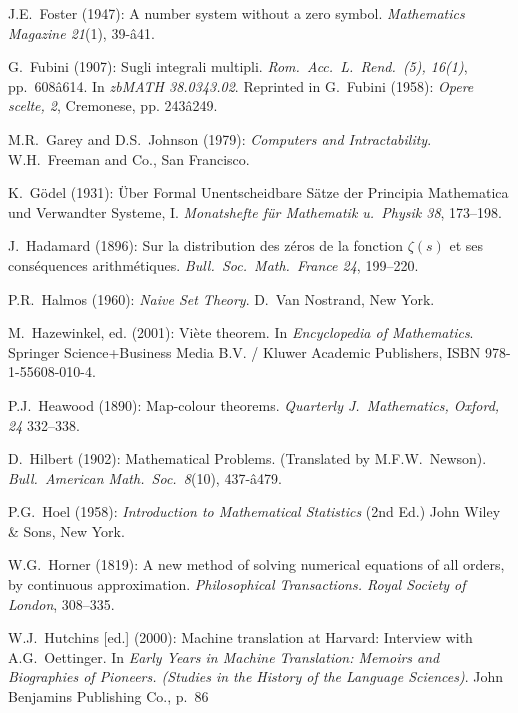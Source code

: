 \begin{thebibliography}{999}
J.E.~Foster (1947): A number system without a zero symbol.
{\it Mathematics Magazine 21}(1), 39-â41.

G.~Fubini (1907): Sugli integrali multipli.
{\it Rom.~Acc.~L.~Rend.~(5), 16(1)}, pp.~608â614.  In {\it zbMATH
  38.0343.02}.  Reprinted in
G.~Fubini (1958): {\it Opere scelte, 2}, Cremonese, pp. 243â249.



M.R.~Garey and D.S.~Johnson (1979):
{\it Computers and Intractability}.
W.H.~Freeman and Co., San Francisco.

K.~G\"{o}del (1931): \"{U}ber Formal Unentscheidbare S\"{a}tze der
Principia Mathematica und Verwandter Systeme, I.  {\it Monatshefte
f\"{u}r Mathematik u.~Physik 38}, 173--198.



J.~Hadamard (1896):
Sur la distribution des z\'{e}ros de la fonction $\zeta(s)$ et ses
cons\'{e}quences arithm\'{e}tiques.
{\it Bull.~Soc.~Math.~France 24}, 199--220.

P.R.~Halmos (1960):
{\it Naive Set Theory}.
D.~Van Nostrand, New York.

M.~Hazewinkel, ed. (2001): %
Vi\`{e}te theorem.  In {\it Encyclopedia of Mathematics}.
Springer Science+Business Media B.V. / Kluwer Academic Publishers,
ISBN 978-1-55608-010-4.

P.J.~Heawood (1890):
Map-colour theorems.  {\it Quarterly J.~Mathematics, Oxford, 24}
332--338.

D.~Hilbert (1902): Mathematical Problems.  (Translated by
M.F.W.~Newson).  {\it Bull.~American Math.~Soc.~8}(10), 437-â479.

P.G.~Hoel (1958):
{\it Introduction to Mathematical Statistics} (2nd Ed.)
John Wiley \& Sons, New York.

W.G.~Horner (1819): 
A new method of solving numerical equations of all orders, by
continuous approximation. {\it Philosophical Transactions. Royal
Society of London}, 308--335.

W.J.~Hutchins [ed.] (2000):
Machine translation at Harvard: Interview with A.G.~Oettinger.
In {\it Early Years in Machine Translation: Memoirs and Biographies of
  Pioneers.  (Studies in the History of the Language Sciences)}.
John Benjamins Publishing Co., p.~86


\end{thebibliography}
